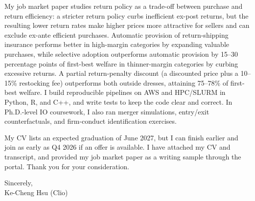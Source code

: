 \documentclass[11pt,letterpaper]{article}
\begin{document}
My job market paper studies return policy as a trade-off between purchase and return efficiency: a stricter return policy curbs inefficient ex-post returns, but the resulting lower return rates make higher prices more attractive for sellers and can exclude ex-ante efficient purchases. Automatic provision of return-shipping insurance performs better in high-margin categories by expanding valuable purchases, while selective adoption outperforms automatic provision by 15--30 percentage points of first-best welfare in thinner-margin categories by curbing excessive returns. A partial return-penalty discount (a discounted price plus a 10--15\% restocking fee) outperforms both outside dresses, attaining 75--78\% of first-best welfare. I build reproducible pipelines on AWS and HPC/SLURM in Python, R, and C++, and write tests to keep the code clear and correct. In Ph.D.-level IO coursework, I also ran merger simulations, entry/exit counterfactuals, and firm-conduct identification exercises.

My CV lists an expected graduation of June 2027, but I can finish earlier and join as early as Q4 2026 if an offer is available. I have attached my CV and transcript, and provided my job market paper as a writing sample through the portal. Thank you for your consideration.

\vspace{0.7em}
Sincerely,\\[1.0em]
Ke-Cheng Hsu (Clio)
\end{document}

